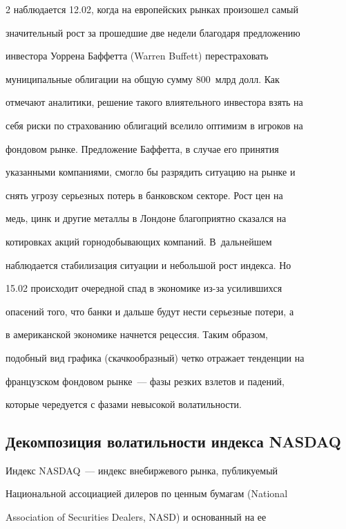 \begin{multicols}{2}
наблюдается 12.02, когда на европейских рынках произошел самый


значительный рост за прошедшие две недели благодаря предложению


инвестора Уоррена Баффетта (Warren Buffett) перестраховать


муниципальные облигации на общую сумму 800~млрд долл. Как


отмечают аналитики, решение такого влиятельного инвестора взять на


себя риски по страхованию облигаций вселило оптимизм в игроков на


фондовом рынке. Предложение Баффетта, в случае его принятия


указанными компаниями, смогло бы разрядить ситуацию на рынке и


снять угрозу серьезных потерь в банковском секторе. Рост цен на


медь, цинк и другие металлы в Лондоне благоприятно сказался на


котировках акций горнодобывающих компаний. В~дальнейшем


наблюдается стабилизация ситуации и небольшой рост индекса. Но


15.02 происходит очередной спад в экономике из-за усилившихся


опасений того, что банки и дальше будут нести серьезные потери, а


в американской экономике начнется рецессия. Таким образом,


подобный вид графика (скачкообразный) четко отражает тенденции на


французском фондовом рынке~--- фазы резких взлетов и падений,


которые чередуется с фазами невысокой волатильности.








\subsection{Декомпозиция волатильности индекса NASDAQ}





Индекс NASDAQ~--- индекс внебиржевого рынка, публикуемый


Национальной ассоциацией дилеров по ценным бумагам (National


Association of Securities Dealers, NASD) и основанный на ее



\end{multicols}
